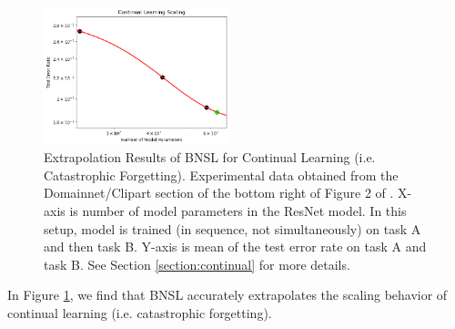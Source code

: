 \documentclass{article} %
\begin{document}
\begin{figure}[htbp]
    \centering
\includegraphics[width=0.48\textwidth]{figures/continual_learning/continual_vision.png}

    \caption{
Extrapolation Results of BNSL for Continual Learning (i.e. Catastrophic Forgetting). Experimental data obtained from the Domainnet/Clipart section of the bottom right of Figure 2 of \citep{ramasesh2022effect}. X-axis is number of model parameters in the ResNet model. In this setup, model is trained (in sequence, not simultaneously) on task A and then task B. Y-axis is mean of the test error rate on task A and task B. See Section \ref{section:continual} for more details.
    }
    \label{fig:continual}
\end{figure}

In Figure \ref{fig:continual}, we find that BNSL accurately extrapolates the scaling behavior of continual learning (i.e. catastrophic forgetting).

\clearpage
\end{document}
